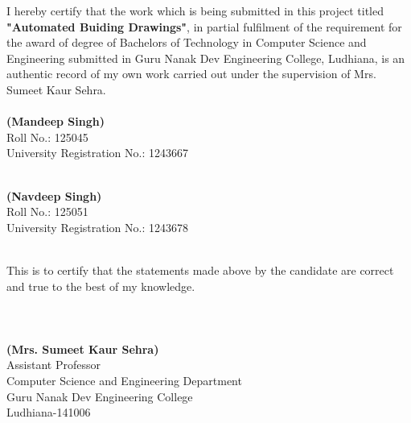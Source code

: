 \begin{Large}
\end{Large}
\vskip 0.1in \noindent I hereby certify that the work which is being submitted in this project titled \textbf{"Automated Buiding Drawings"},
in partial fulfilment of the requirement for the award of degree of Bachelors of Technology in Computer
Science and Engineering submitted in Guru Nanak Dev Engineering College, Ludhiana, is an authentic
record of my own work carried out under the supervision of Mrs. Sumeet Kaur Sehra.\\\\\vskip 0.3in
\noindent\textbf{(Mandeep Singh)}\\
Roll No.: 125045 \\
University Registration No.: 1243667 \\\\\vskip 0.3in

\noindent\textbf{(Navdeep Singh)}\\
Roll No.: 125051 \\
University Registration No.: 1243678 \\\\\vskip 0.2in

\noindent This is to certify that the statements made above by the candidate are correct and true to the best of my knowledge.\\\\\\\\


\noindent \textbf{(Mrs. Sumeet Kaur Sehra)}\\
Assistant Professor\\
Computer Science and Engineering Department\\
Guru Nanak Dev Engineering College\\
Ludhiana-141006